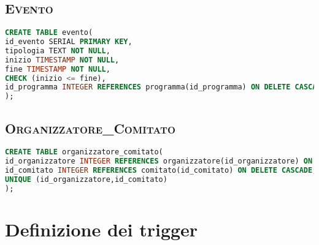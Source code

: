 \subsection{\textsc{Evento}}
\begin{lstlisting}[language=SQL,style=mystyle, caption={Tabella: Evento}]
CREATE TABLE evento(
id_evento SERIAL PRIMARY KEY,
tipologia TEXT NOT NULL,
inizio TIMESTAMP NOT NULL,
fine TIMESTAMP NOT NULL,
CHECK (inizio <= fine), 
id_programma INTEGER REFERENCES programma(id_programma) ON DELETE CASCADE NOT NULL
);
\end{lstlisting}
\subsection{\textsc{Organizzatore\_Comitato}}
\begin{lstlisting}[language=SQL,style=mystyle, caption={Tabella: Organizzatore\_Comitato}]
CREATE TABLE organizzatore_comitato(
id_organizzatore INTEGER REFERENCES organizzatore(id_organizzatore) ON DELETE CASCADE,
id_comitato INTEGER REFERENCES comitato(id_comitato) ON DELETE CASCADE,
UNIQUE (id_organizzatore,id_comitato) 
);
\end{lstlisting}
\section{Definizione dei trigger}
